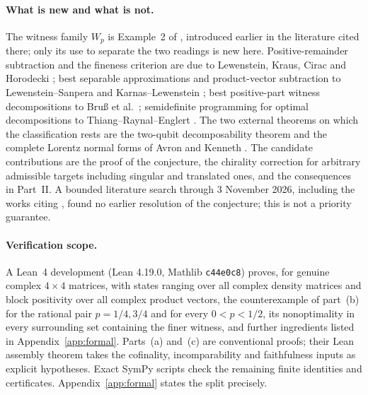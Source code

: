 \documentclass[11pt,a4paper]{article}
\theoremstyle{definition}\newtheorem{definition}[theorem]{Definition}
\theoremstyle{plain}\newtheorem*{theorem*}{Theorem}
\begin{document}
\paragraph{What is new and what is not.} The witness family $W_p$ is Example~2 of \cite{milne}, introduced earlier in the literature cited there; only its use to separate the two readings is new here. Positive-remainder subtraction and the fineness criterion are due to Lewenstein, Kraus, Cirac and Horodecki \cite{lewenstein}; best separable approximations and product-vector subtraction to Lewenstein--Sanpera and Karnas--Lewenstein \cite{ls,karnas}; best positive-part witness decompositions to Bru\ss{} et al.\ \cite{bruss}; semidefinite programming for optimal decompositions to Thiang--Raynal--Englert \cite{thiang}. The two external theorems on which the classification rests are the two-qubit decomposability theorem \cite{woronowicz} and the complete Lorentz normal forms of Avron and Kenneth \cite{avron}. The candidate contributions are the proof of the conjecture, the chirality correction for arbitrary admissible targets including singular and translated ones, and the consequences in Part~II. A bounded literature search through 3 November 2026, including the works citing \cite{milne}, found no earlier resolution of the conjecture; this is not a priority guarantee.

\paragraph{Verification scope.} A Lean~4 development (Lean 4.19.0, Mathlib \texttt{c44e0c8}) proves, for genuine complex $4\times4$ matrices, with states ranging over all complex density matrices and block positivity over all complex product vectors, the counterexample of part~(b) for the rational pair $p=1/4,3/4$ and for every $0<p<1/2$, its nonoptimality in every surrounding set containing the finer witness, and further ingredients listed in Appendix~\ref{app:formal}. Parts~(a) and~(c) are conventional proofs; their Lean assembly theorem takes the cofinality, incomparability and faithfulness inputs as explicit hypotheses. Exact SymPy scripts check the remaining finite identities and certificates. Appendix~\ref{app:formal} states the split precisely.
\end{document}
